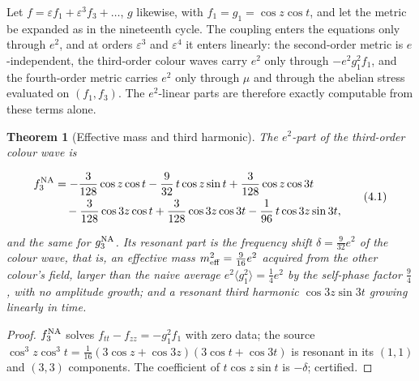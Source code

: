 \documentclass[11pt]{article}
\newtheorem{theorem}{Theorem}[section]
\theoremstyle{remark}
\begin{document}
Let \(f=\varepsilon f_1+\varepsilon^3f_3+\dots\), \(g\) likewise, with
\(f_1=g_1=\cos z\cos t\), and let the metric be expanded as in the
nineteenth cycle.  The coupling enters the equations only through
\(e^2\), and at orders \(\varepsilon^3\) and \(\varepsilon^4\) it enters
linearly: the second-order metric is \(e\)-independent, the third-order
colour waves carry \(e^2\) only through \(-e^2g_1^2f_1\), and the
fourth-order metric carries \(e^2\) only through \(\mu\) and through the
abelian stress evaluated on \((f_1,f_3)\).  The \(e^2\)-linear parts
are therefore exactly computable from these terms alone.

\begin{theorem}[Effective mass and third harmonic]
\label{thm:v20v1-mass}
The \(e^2\)-part of the third-order colour wave is

\[
\begin{aligned}
 f_3^{\rm NA}&=-\frac3{128}\cos z\cos t-\frac9{32}\,t\cos z\sin t+\frac3{128}\cos z\cos3t\\
 &\quad-\frac3{128}\cos3z\cos t+\frac3{128}\cos3z\cos3t-\frac1{96}\,t\cos3z\sin3t,
\end{aligned}                                                          \tag{4.1}
\]

and the same for \(g_3^{\rm NA}\).  Its resonant part is the frequency
shift \(\delta=\tfrac9{32}e^2\) of the colour wave, that is, an
effective mass \(m_{\rm eff}^2=\tfrac9{16}e^2\) acquired from the other
colour's field, larger than the naive average \(e^2\langle g_1^2\rangle=\tfrac14e^2\)
by the self-phase factor \(\tfrac94\), with no amplitude growth; and a
resonant third harmonic \(\cos3z\sin3t\) growing linearly in time.
\end{theorem}

\begin{proof}
\(f_3^{\rm NA}\) solves \(f_{tt}-f_{zz}=-g_1^2f_1\) with zero data; the
source \(\cos^3z\cos^3t=\tfrac1{16}(3\cos z+\cos3z)(3\cos t+\cos3t)\)
is resonant in its \((1,1)\) and \((3,3)\) components.  The
coefficient of \(t\cos z\sin t\) is \(-\delta\); certified.
\end{proof}
\end{document}
